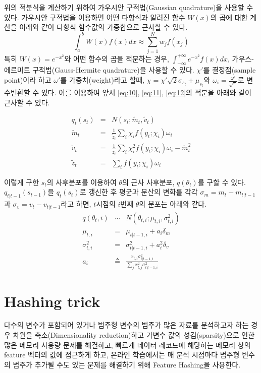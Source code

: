 \documentclass[oneside,b5paper,11pt]{book} %
\begin{document}
위의 적분식을 계산하기 위하여 가우시안 구적법(Gaussian quadrature)을 사용할 수 있다. 가우시안 구적법을 이용하면 어떤 다항식과 알려진 함수 $W(x)$의 곱에 대한 계산을 아래와 같이 다항식 함수값의 가중합으로 근사할 수 있다.
$$\int^b_a W(x)f(x)dx \approx \sum^N_{j=1}w_j f(x_j)$$
특히 $W(x)=e^{-x^2}$와 어떤 함수의 곱을 적분하는 경우, $\int^{+\infty}_{-\infty}e^{-x^2}f(x)dx$, 가우스-에르미트 구적법(Gauss-Hermite quadrature)을 사용할 수 있다. $\chi'$를 결정점(sample point)이라 하고 $\omega'$를 가중치(weight)라고 할때,  $\chi=\chi'\sqrt{2}\sigma_{s_t}+\mu_{s_t}$와 $\omega_i = \frac{\omega'}{\sqrt{\pi}}$로 변수변환할 수 있다. 이를 이용하여 앞서 \ref{eq:10}, \ref{eq:11}, \ref{eq:12}의 적분을 아래와 같이 근사할 수 있다.\citep{Zoeter2007}

\begin{eqnarray}
q_t(s_t) &=& N(s_t; \tilde{m}_t, \tilde{v}_t)
\\ \tilde{m}_t &=& \frac{1}{\tilde{z}_t} \sum_i \chi_i f(y_t; \chi_i ) \omega_i
\\ \tilde{v}_t &=& \frac{1}{\tilde{z}_t} \sum_i \chi^2_i f(y_t; \chi_i ) \omega_i - \tilde{m}^2_t
\\ \tilde{z}_t &=& \sum_i f(y_t; \chi_i ) \omega_i
\end{eqnarray}

이렇게 구한 $s_t$의 사후분포를 이용하여 $\theta$의 근사 사후분포,  $q(\theta_t)$를 구할 수 있다. $q_{t|t-1}(s_{t-1})$을 $q_{t}(s_t)$로 갱신한 후 평균과 분산의 변화를 각각 $\sigma_m = m_t - m_{t|t-1}$과 $\sigma_v = v_t - v_{t|t-1}$라고 하면, $t$시점의 $i$번째 $\theta$의 분포는 아래와 같다.\citep{Murphy2012}
\begin{eqnarray}
   q(\theta_t,i) &\sim& N(\theta_{t,i};\mu_{t,i}, \sigma^2_{t,i})
\\ \mu_{t,i} &=& \mu_{t|t-1,i} + a_i \delta_m
\\ \sigma^2_{t,i} &=& \sigma^2_{t|t-1,i} + a^2_i \delta_v
\\ a_i &\triangleq& \frac{x_{t,i}\sigma^2_{t|t-1,i}}{\sum_j x^2_{t,j}\sigma^2_{t|t-1,i}}
\end{eqnarray}




\section{Hashing trick}
 다수의 변수가 포함되어 있거나 범주형 변수의 범주가 많은 자료를 분석하고자 하는 경우 차원을 축소(Dimensionality reduction)하고 가변수 값의 성김(sparsity)으로 인한 많은 메모리 사용량 문제를 해결하고, 빠르게 데이터 레코드에 해당하는 메모리 상의 feature 벡터의 값에 접근하게 하고, 온라인 학습에서는 매 분석 시점마다 범주형 변수의 범주가 추가될 수도 있는 문제를 해결하기 위해 Feature Hashing을 사용한다.
\end{document}
